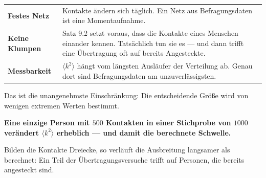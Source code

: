 \begin{warnung}
\begin{center}
{\small
\renewcommand{\arraystretch}{1.5}
\begin{tabular}{@{}P{2.6cm}P{6.0cm}@{}}
\toprule
\textbf{Festes Netz} & Kontakte ändern sich täglich. Ein Netz aus Befragungsdaten ist eine Momentaufnahme.\\
\textbf{Keine Klumpen} & Satz 9.2 setzt voraus, dass die Kontakte eines Menschen einander  kennen. Tatsächlich tun sie es --- und dann trifft eine Übertragung oft auf bereits Angesteckte.\\
\textbf{Messbarkeit} & $\langle k^2\rangle$ hängt vom längsten Ausläufer der Verteilung ab. Genau dort sind Befragungsdaten am unzuverlässigsten.\\
\bottomrule
\end{tabular}}
\end{center}

Das ist die unangenehmste Einschränkung: Die entscheidende Größe wird von wenigen extremen Werten bestimmt.

\begin{center}
\begin{minipage}{0.9\textwidth}
\textbf{Eine einzige Person mit $500$ Kontakten in einer Stichprobe von $1000$ verändert $\langle k^2\rangle$ erheblich --- und damit die berechnete Schwelle.}
\end{minipage}
\end{center}

\begin{center}
\begin{minipage}{0.88\textwidth}
\end{minipage}
\end{center}

Bilden die Kontakte Dreiecke, so verläuft die Ausbreitung langsamer als berechnet: Ein Teil der Übertragungsversuche trifft auf Personen, die bereits angesteckt sind.

\begin{center}
\begin{minipage}{0.88\textwidth}
\end{minipage}
\end{center}
\end{warnung}


